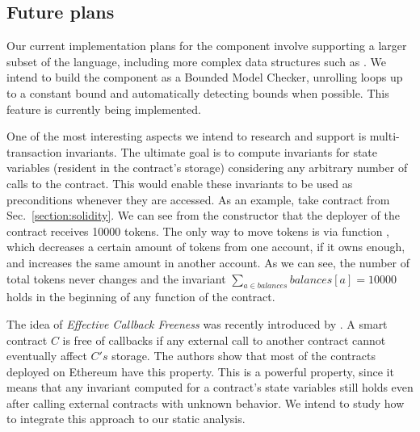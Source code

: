 \subsection{Future plans}

Our current implementation plans for the component involve supporting
a larger subset of the language, including more complex data structures
such as .
%
We intend to build the component as a Bounded Model Checker, unrolling loops
up to a constant bound and automatically detecting bounds when possible.
%
This feature is currently being implemented.

One of the most interesting aspects we intend to research and support is
multi-transaction invariants.
%
The ultimate goal is to compute invariants for state variables (resident in the
contract's storage) considering any arbitrary number of calls to the contract.
%
This would enable these invariants to be used as preconditions whenever they
are accessed.
%
As an example, take contract  from Sec.~\ref{section:solidity}.
%
We can see from the constructor that the deployer of the contract receives
10000 tokens.
%
The only way to move tokens is via function , which decreases a
certain amount of tokens from one account, if it owns enough, and increases the
same amount in another account.
%
As we can see, the number of total tokens never changes and the invariant
$\sum_{a \in balances} balances[a] = 10000$  holds
in the beginning of any function of the contract.


The idea of \emph{Effective Callback Freeness} was recently introduced by
\cite{Grossman}.
%
A smart contract $C$ is free of callbacks if any external call to another
contract cannot eventually affect $C's$ storage.
%
The authors show that most of the contracts deployed on Ethereum have this
property.
%
This is a powerful property, since it means that any invariant computed for a
contract's state variables still holds even after calling external contracts
with unknown behavior.
%
We intend to study how to integrate this approach to our static analysis.
